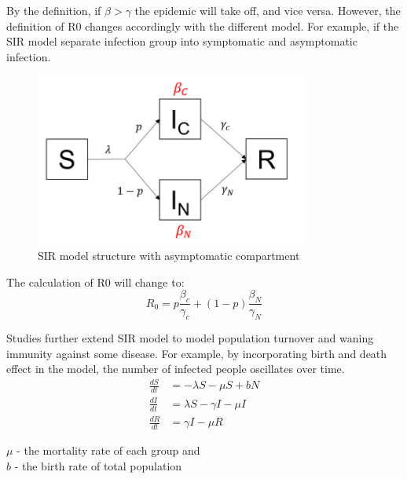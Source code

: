 \documentclass[a4paper, 12pt, twoside]{article}
\begin{document}
By the definition, if $\beta > \gamma$ the epidemic will take off, and vice versa.
However, the definition of \gls{R0} changes accordingly with the different model.
For example, if the SIR model separate infection group into symptomatic and asymptomatic infection.
\begin{figure}[htpb]
	\centering
	\includegraphics[width=0.8\textwidth]{sir-model-asymptomatic}
	\caption{SIR model structure with asymptomatic compartment}
	\label{fig:sir_model_structure_with_asymptomatic_compartment}
\end{figure}

The calculation of \gls{R0} will change to:
\begin{equation}
	R_0 = p \frac{\beta_c}{\gamma_c} + (1-p) \frac{\beta_N}{\gamma_N}
\end{equation}

Studies further extend SIR model to model population turnover and waning immunity against some disease.
For example, by incorporating birth and death effect in the model, the number of infected people oscillates over time.
\begin{align}
	\frac{dS}{dt} & = - \lambda S - \mu S + bN     \\
	\frac{dI}{dt} & = \lambda S - \gamma I - \mu I \\
	\frac{dR}{dt} & = \gamma I - \mu R
\end{align}
\begin{center}
	$\mu$ - the mortality rate of each group and \\
	$b$ - the birth rate of total population
\end{center}
\end{document}
